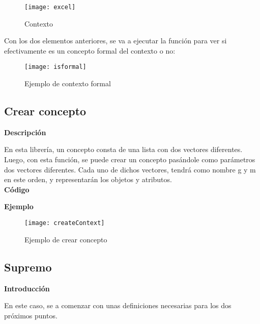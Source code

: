         \begin{figure}[H]
            \centering
            \texttt{[image: excel]}
            \caption{Contexto}
            \label{fig:excel}
        \end{figure}


        Con los dos elementos anteriores, se va a ejecutar la funci\'on para ver si efectivamente es un concepto formal del contexto o no:

        \begin{figure}[H]
            \centering
            \texttt{[image: isformal]}
            \caption{Ejemplo de contexto formal}
            \label{fig:isformal}
        \end{figure}

        \clearpage



    \subsection{Crear concepto}

        \textbf{Descripci\'on}

        En esta librer\'ia, un concepto consta de una lista con dos vectores diferentes. Luego, con esta funci\'on, se puede crear un concepto 
        pas\'andole como par\'ametros dos vectores diferentes.
        Cada uno de dichos vectores, tendr\'a como nombre g y m en este orden, y representar\'an los objetos y atributos.
        \\
        

        \textbf{C\'odigo}

        

        \bigskip

        \textbf{Ejemplo}

        \begin{figure}[H]
            \centering
            \texttt{[image: createContext]}
            \caption{Ejemplo de crear concepto}
            \label{fig:createContext}
        \end{figure}




    \subsection{Supremo}


        \textbf{Introducci\'on}
    
        En este caso, se a comenzar con unas definiciones necesarias para los dos pr\'oximos puntos.
        \\

